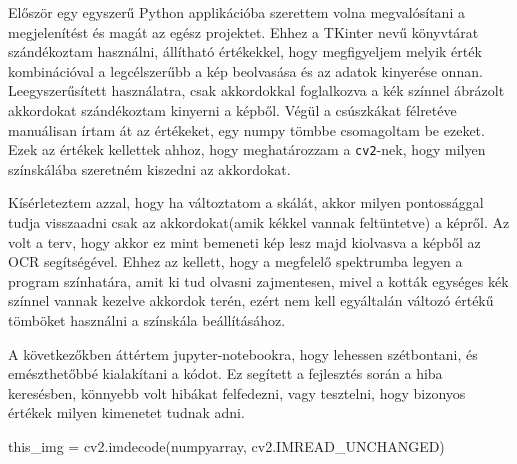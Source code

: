 




Először egy egyszerű Python applikációba szerettem volna megvalósítani a megjelenítést és magát az egész projektet. Ehhez a TKinter nevű könyvtárat szándékoztam használni, állítható értékekkel, hogy megfigyeljem melyik érték kombinációval a legcélszerűbb a kép beolvasása és az adatok kinyerése onnan. Leegyszerűsített használatra, csak akkordokkal foglalkozva a kék színnel ábrázolt akkordokat szándékoztam kinyerni a képből. Végül a csúszkákat félretéve manuálisan írtam át az értékeket, egy numpy tömbbe csomagoltam be ezeket. Ezek az értékek kellettek ahhoz, hogy meghatározzam a \texttt{cv2}-nek, hogy milyen színskálába szeretném kiszedni az akkordokat. 

Kísérleteztem azzal, hogy ha változtatom a skálát, akkor milyen pontossággal tudja visszaadni csak az akkordokat(amik kékkel vannak feltüntetve) a képről. Az volt a terv, hogy akkor ez mint bemeneti kép lesz majd kiolvasva a képből az OCR segítségével. Ehhez az kellett, hogy a megfelelő spektrumba legyen a program színhatára, amit ki tud olvasni zajmentesen, mivel a kották egységes kék színnel vannak kezelve akkordok terén, ezért nem kell egyáltalán változó értékű tömböket használni a színskála beállításához.


A következőkben áttértem jupyter-notebookra, hogy lehessen szétbontani, és emészthetőbbé kialakítani a kódot. Ez segített a fejlesztés során a hiba keresésben, könnyebb volt hibákat felfedezni, vagy tesztelni, hogy bizonyos értékek milyen kimenetet tudnak adni.
\begin{python}
this_img = cv2.imdecode(numpyarray, cv2.IMREAD_UNCHANGED)	
\end{python}


